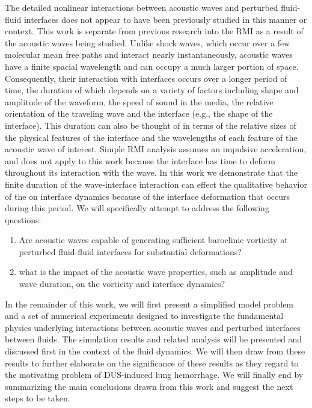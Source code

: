 The detailed nonlinear interactions between acoustic waves and
perturbed fluid-fluid interfaces does not appear to have been
previously studied in this manner or context. This work is separate
from previous research into the \ac{RMI} as a result of the acoustic
waves being studied. Unlike shock waves, which occur over a few
molecular mean free paths and interact nearly instantaneously,
acoustic waves have a finite spacial wavelength and can occupy a much
larger portion of space. Consequently, their interaction with
interfaces occurs over a longer period of time, the duration of which
depends on a variety of factors including shape and amplitude of the
waveform, the speed of sound in the media, the relative orientation of
the traveling wave and the interface (e.g., the shape of the
interface). This duration can also be thought of in terms of the
relative sizes of the physical features of the interface and the
wavelengths of each feature of the acoustic wave of interest. Simple
\ac{RMI} analysis assumes an impulsive acceleration, and does not
apply to this work because the interface has time to deform throughout its
interaction with the wave. In this work we demonstrate that the finite
duration of the wave-interface interaction can effect the qualitative
behavior of the on interface dynamics because of the interface
deformation that occurs during this period. We will specifically
attempt to address the following questions:
\begin{enumerate} \label{itm:usbe_lung_questions}
\item Are acoustic waves capable of generating sufficient baroclinic
  vorticity at perturbed fluid-fluid interfaces for substantial
  deformations?
\item what is the impact of the acoustic wave properties, such as
  amplitude and wave duration, on the vorticity and interface
  dynamics?
\end{enumerate}

In the remainder of this work, we will first present a simplified
model problem and a set of numerical experiments designed to
investigate the fundamental physics underlying interactions between
acoustic waves and perturbed interfaces between fluids. The simulation
results and related analysis will be presented and discussed first in
the context of the fluid dynamics. We will then draw from these
results to further elaborate on the significance of these results as
they regard to the motivating problem of \ac{DUS}-induced lung
hemorrhage. We will finally end by summarizing the main conclusions
drawn from this work and suggest the next steps to be taken.

